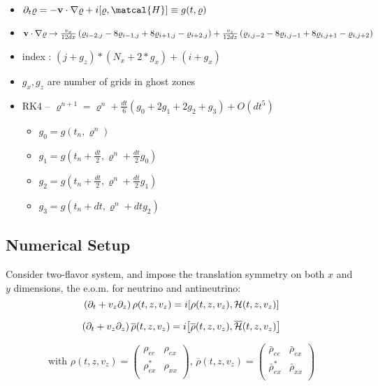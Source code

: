 \documentclass[11pt,a4paper]{article}
\begin{document}
\begin{itemize}
   \item $\partial _{t} \varrho = - \vb{v}\cdot \nabla \varrho + i \comm{\varrho}{\matcal{H}} \equiv g(t,  \varrho)$
   \item $\vb{v} \cdot \nabla \varrho \rightarrow \frac{v_{x}}{12 dx}\left(\varrho_{i-2,j} - 8\varrho_{i-1, j} + 8\varrho_{i+1, j} - \varrho_{i+2,j }\right) + \frac{v_{z}}{12dz} \left(  \varrho_{i,j-2} -8\varrho_{i,j-1} + 8\varrho_{i,j+1} -\varrho_{i,j+2} \right)$
   \item index : $(j+g_{z})*(N_{x} + 2*g_{x}) + (i+g_{x})$
   \item $g_{x}, g_{z}$ are number of grids in ghost zones
   \item RK4 -- $\varrho ^{n+1} = \varrho^{n} + \frac{dt}{6}\left( g_{0} + 2 g_{1} + 2g_{2} + g_{3}\right) + O(dt ^{5})$
        \begin{itemize}
           \item  $g_{0} = g(t_{n}, \varrho^{n})$
           \item $g_{1} = g(t_{n} + \frac{dt}{2}, \varrho^{n} + \frac{dt}{2}g_{0})$
           \item $g_{2} = g(t_{n} + \frac{dt}{2} , \varrho^{n} + \frac{dt}{2}g_{1})$
           \item $g_{3} = g(t_{n} + dt, \varrho^{n} + dt g_{2})$
        \end{itemize}
 \end{itemize}



\subsection{Numerical Setup}%
 \label{sub:Perturbation from an initial state}

 Consider two-flavor system, and impose the translation symmetry on both $x$ and $y$ dimensions, the e.o.m. for neutrino and antineutrino: 
\begin{equation*}
   \left(   \partial _{t} + v_{z}\partial_{z}\right)\rho(t,z,v_{z}) = i \comm{\rho(t,z,v_{z})}{\mathcal{H}(t,z,v_{z})}
\end{equation*}

\begin{equation*}
   \left(   \partial _{t} + v_{z}\partial_{z}\right)\overline{\rho}(t,z,v_{z}) = i \comm{\overline{\rho}(t,z,v_{z})}{\overline{\mathcal{H}}(t,z,v_{z})}
\end{equation*}

\begin{equation*}
   \text{with } \rho(t,z,v_{z}) = \begin{pmatrix}
      \rho_{ee} & \rho_{ex}\\
      \rho^{*}_{ex} & \rho_{x x}\\
   \end{pmatrix} \text{, }
   \overline{\rho}(t,z,v_{z}) = \begin{pmatrix}
      \bar\rho_{ee} & \bar\rho_{ex}\\
      \bar\rho^{*}_{ex} & \bar\rho_{x x}\\
   \end{pmatrix}
\end{equation*}
\end{document}
